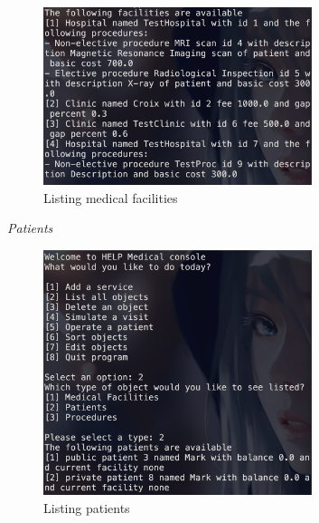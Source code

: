 \documentclass{article}
\begin{document}
	\begin{figure}
		\begin{center}
			\includegraphics[width=0.7\textwidth]{figures/Listing/Listing_Medical_02.png}
		\end{center}
		\caption{Listing medical facilities}\label{fig:listing_medical_02}
	\end{figure}
	
  \pagebreak

	\textit{Patients}
	\begin{figure}
		\begin{center}
			\includegraphics[width=0.7\textwidth]{figures/Listing/Listing_Patients.png}
		\end{center}
		\caption{Listing patients}\label{fig:listing_patients}
	\end{figure}
\end{document}

